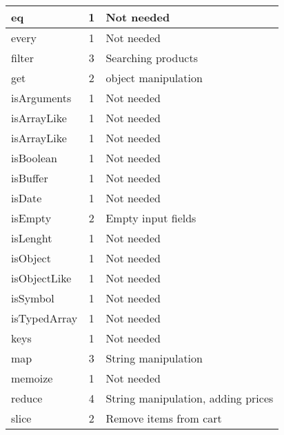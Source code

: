 \documentclass[a4paper, 12pt]{article}
\begin{document}
\begin{table}[h]
\begin{tabular}{l|c|l}
	    eq           & 1                 & Not needed                            \\ \hline
	    every        & 1                 & Not needed                            \\ \hline
	    filter       & 3                 & Searching products                    \\ \hline
	    get          & 2                 & object manipulation                   \\ \hline
	    isArguments  & 1                 & Not needed                            \\ \hline
	    isArrayLike  & 1                 & Not needed                            \\ \hline
	    isArrayLike  & 1                 & Not needed                            \\ \hline
	    isBoolean    & 1                 & Not needed                            \\ \hline
	    isBuffer     & 1                 & Not needed                            \\ \hline
	    isDate       & 1                 & Not needed                            \\ \hline
	    isEmpty      & 2                 & Empty input fields                    \\ \hline
	    isLenght     & 1                 & Not needed                            \\ \hline
	    isObject     & 1                 & Not needed                            \\ \hline
	    isObjectLike & 1                 & Not needed                            \\ \hline
	    isSymbol     & 1                 & Not needed                            \\ \hline
	    isTypedArray & 1                 & Not needed                            \\ \hline
	    keys         & 1                 & Not needed                            \\ \hline
	    map          & 3                 & String manipulation                   \\ \hline
	    memoize      & 1                 & Not needed                            \\ \hline
	    reduce       & 4                 & String manipulation, adding prices    \\ \hline
	    slice        & 2                 & Remove items from cart                \\ \hline

\end{tabular}
\end{table}
\end{document}
